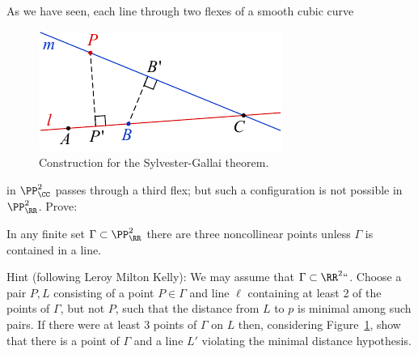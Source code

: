 \begin{exercise}\label{Sylvester-Gallai-Kelly}
As we have seen, each line through two flexes of a smooth  cubic curve
%
\begin{figure} %
\includegraphics[height=.95in]{main/Sylvester_Gallai_Kelly_proof}
\vskip-8pt
\caption{Construction for the Sylvester-Gallai theorem.}
\label{Fig4-S}
\end{figure}
%
in $\PP^2_\CC$ passes through a third flex; but
such a configuration is not possible in $\PP^2_\RR$. Prove:

\begin{theorem}
In any finite set  $\Gamma \subset \PP^2_\RR$ there are three
noncollinear points unless $\Gamma$ is contained in a line.
\unif
\end{theorem}

Hint (following Leroy Milton Kelly):
%
We may assume that $\Gamma\subset \RR^2` `$. Choose a pair $P,L$ consisting of a point $P\in\Gamma$ and line $\ell$ containing at least 2 of the points of $\Gamma$, but not $P$, such that the distance from $L$ to $p$ is
minimal among such pairs. If there were at least 3 points of $\Gamma$
on $L$ then, considering
Figure~\ref{Fig4-S},
show that
there is a point of $\Gamma$ and a line $L'$ violating the minimal distance hypothesis.
\end{exercise}
